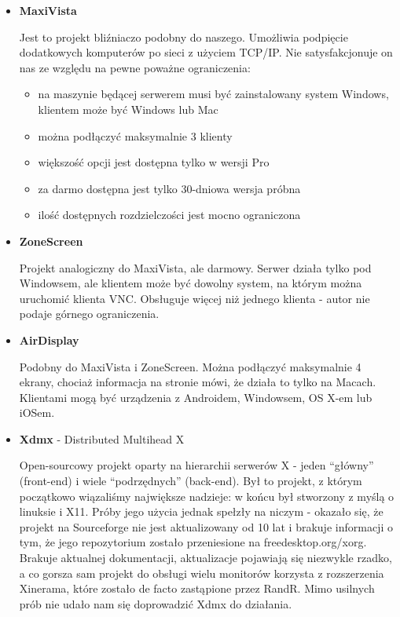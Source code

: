     \begin{itemize}

      \item \textbf{MaxiVista} \cite{ProjMaxiVista}

        Jest to projekt bliźniaczo podobny do naszego. Umożliwia podpięcie dodatkowych komputerów po sieci z użyciem TCP/IP. Nie satysfakcjonuje on nas ze względu na pewne poważne ograniczenia:
        \begin{itemize}
          \item na maszynie będącej serwerem musi być zainstalowany system Windows, klientem może być Windows lub Mac
          \item można podłączyć maksymalnie 3 klienty
          \item większość opcji jest dostępna tylko w wersji Pro
          \item za darmo dostępna jest tylko 30-dniowa wersja próbna
          \item ilość dostępnych rozdzielczości jest mocno ograniczona
        \end{itemize}

      \item \textbf{ZoneScreen} \cite{ProjZoneScreen}

        Projekt analogiczny do MaxiVista, ale darmowy. Serwer działa tylko pod Windowsem, ale klientem może być dowolny system, na którym można uruchomić klienta VNC. Obsługuje więcej niż jednego klienta - autor nie podaje górnego ograniczenia.

      \item \textbf{AirDisplay} \cite{ProjAirDisplay}

        Podobny do MaxiVista i ZoneScreen. Można podłączyć maksymalnie 4 ekrany, chociaż informacja na stronie mówi, że działa to tylko na Macach. Klientami mogą być urządzenia z Androidem, Windowsem, OS X-em lub iOSem.

      \item \textbf{Xdmx} - Distributed Multihead X \cite{ProjXDMX}

        Open-sourcowy projekt oparty na hierarchii serwerów X - jeden ``główny'' (front-end) i wiele ``podrzędnych'' (back-end). Był to projekt, z którym początkowo wiązaliśmy największe nadzieje: w końcu był stworzony z myślą o linuksie i X11. Próby jego użycia jednak spełzły na niczym - okazało się, że projekt na Sourceforge nie jest aktualizowany od 10 lat i brakuje informacji o tym, że jego repozytorium zostało przeniesione na freedesktop.org/xorg. Brakuje aktualnej dokumentacji, aktualizacje pojawiają się niezwykle rzadko, a co gorsza sam projekt do obsługi wielu monitorów korzysta z rozszerzenia Xinerama, które zostało de facto zastąpione przez RandR. Mimo usilnych prób nie udało nam się doprowadzić Xdmx do działania.


\end{itemize}
